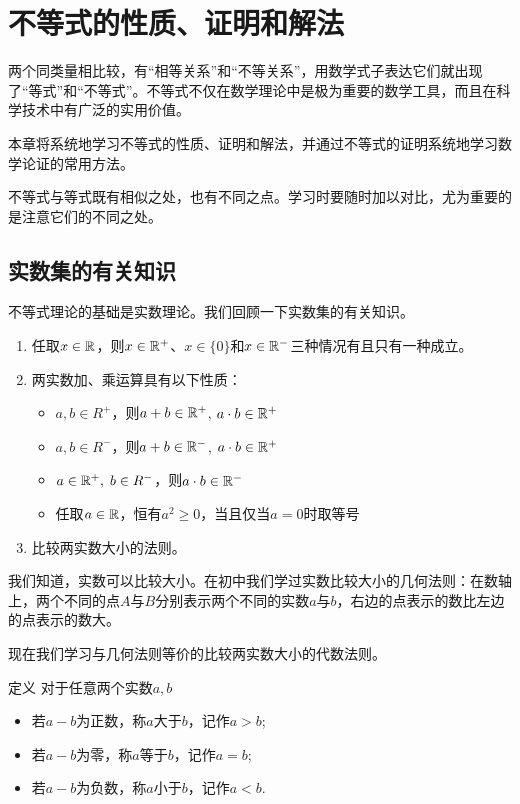 \chapter{不等式的性质、证明和解法}
两个同类量相比较，有“相等关系”和“不等关系”，用数学式子表达它们就出现了“等式”和“不等式”。不等式不仅在数学理论中是极为重要的数学工具，而且在科学技术中有广泛的实用价值。

本章将系统地学习不等式的性质、证明和解法，并通过不等式的证明系统地学习数学论证的常用方法。

不等式与等式既有相似之处，也有不同之点。学习时要随时加以对比，尤为重要的是注意它们的不同之处。

\section{实数集的有关知识}

不等式理论的基础是实数理论。我们回顾一下实数集的有关知识。

\begin{enumerate}
    \item 任取$x\in\mathbb{R}$，则$x\in\mathbb{R}^+$、$x\in\{0\}$和$x\in \mathbb{R}^-$三种情况有且只有一种成立。
    \item 两实数加、乘运算具有以下性质：
    \begin{itemize}
        \item $a,b\in R^+$，则$a+b\in\mathbb{R}^+$, $a\cdot b\in\mathbb{R}^+$
        \item $a,b\in R^-$，则$a+b\in\mathbb{R}^-$, $a\cdot b\in\mathbb{R}^+$
        \item $a\in\mathbb{R}^+,\; b\in R^-$，则$a\cdot b\in\mathbb{R}^-$
        \item 任取$a\in\mathbb{R}$，恒有$a^2\ge 0$，当且仅当$a=0$时取等号
    \end{itemize}
    \item 比较两实数大小的法则。
\end{enumerate}

我们知道，实数可以比较大小。在初中我们学过实数比较大小的几何法则：在数轴上，两个不同的点$A$与$B$分别表示两个不同的实数$a$与$b$，右边的点表示的数比左边的点表示的数大。

现在我们学习与几何法则等价的比较两实数大小的代数法则。

\begin{thm}{定义}
对于任意两个实数$a,b$
\begin{itemize}
    \item 若$a-b$为正数，称$a$大于$b$，记作$a>b$;
    \item 若$a-b$为零，称$a$等于$b$，记作$a=b$;
    \item 若$a-b$为负数，称$a$小于$b$，记作$a<b$.
\end{itemize}
\end{thm}

